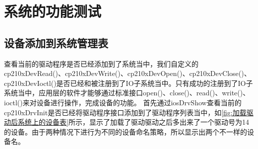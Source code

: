 \chapter{系统的功能测试}
\section{设备添加到系统管理表}
	查看当前的驱动程序是否已经添加到了系统当中，我们自定义的cp210xDevRead()、cp210xDevWrite()、cp210xDevOpen()、cp210xDevClose()、cp210xDevIoctl()是否已经和被注册到了IO子系统当中。只有成功的注册到了IO子系统当中，应用层的软件才能够通过标准接口open()、close()、read()、write()、ioctl()来对设备进行操作，完成设备的功能。
	首先通过iosDrvShow查看当前的cp210xDrvInit是否已经将驱动程序接口添加到了驱动程序列表当中，如\autoref{fig:加载驱动后系统上的设备表}所示，显示了加载了驱动驱动之后多出来了一个驱动号为14的设备。由于两种情况下进行为不同的设备命名策略，所以显示出两个不一样的设备名。
	
